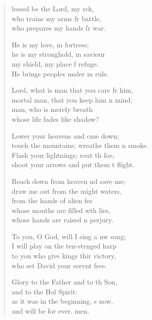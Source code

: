 \setlength{\leftmargini}{\Aleftmargini}  %
\begin{verse}
  \begin{patverse}
lessed be the Lord, my rck,\Flex\\
who trains my arms fr battle,\Med\\
who prepares my hands fr war.

He is my love, m fortress;\Med\\
he is my stronghold, m saviour\\
my shield, my place f refuge.\Med\\
He brings peoples under m rule.

Lord, what is man that you care fr him,\Med\\
mortal man, that you keep him \pointup{\i}n mind;\\
man, who is merely  breath\Med\\
whose life fades like  shadow?

Lower your heavens and cme down;\Med\\
touch the mountains; wreathe them \pointup{\i}n smoke.\\
Flash your lightnings; rout th foe,\Med\\
shoot your arrows and put them t flight.

Reach down from heaven nd save me;\Med\\
draw me out from the might waters,\\
from the hands of alien fes\Flex\\
whose mouths are filled w\pointup{\i}th lies,\Med\\
whose hands are raised \pointup{\i}n perjury.

To you, O God, will I sing a nw song;\Med\\
I will play on the ten-str\pointup{\i}nged harp\\
to you who give kings thir victory,\Med\\
who set David your servnt free.

Glory to the Father and to th Son,\Med\\
and to the Hol Spirit:\\
as it was in the beginning, \pointup{\i}s now,\Med\\
and will be for ever. men.
  \end{patverse}
\end{verse}
\setlength{\leftmargini}{\defleftmargini}  %
